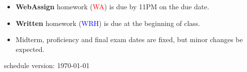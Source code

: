\documentclass[12pt]{article}
\begin{document}
\begin{itemize}
\item \textbf{WebAssign} homework (\textcolor{red}{WA}) is due by 11PM on the due date.
\item \textbf{Written} homework (\textcolor{blue}{WRH}) is due at the beginning of class.
\item Midterm, proficiency and final exam dates are fixed, but minor changes be expected.
\end{itemize}



\vfill
\hfill \scriptsize schedule version: \today \normalsize
\end{document}
